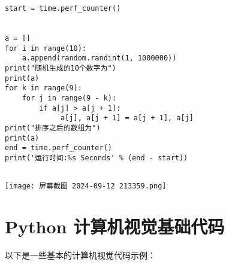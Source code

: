 \documentclass{ctexart}
\begin{document}
\begin{enumerate}[label=\arabic*.]
\begin{lstlisting}
start = time.perf_counter()


a = []
for i in range(10):
    a.append(random.randint(1, 1000000))
print("随机生成的10个数字为")
print(a)
for k in range(9):
    for j in range(9 - k):
        if a[j] > a[j + 1]:
             a[j], a[j + 1] = a[j + 1], a[j]
print("排序之后的数组为")
print(a)
end = time.perf_counter()
print('运行时间:%s Seconds' % (end - start))


\end{lstlisting}
\texttt{[image: 屏幕截图 2024-09-12 213359.png]}
\end{enumerate}

\section{Python 计算机视觉基础代码}
以下是一些基本的计算机视觉代码示例：
\end{document}
